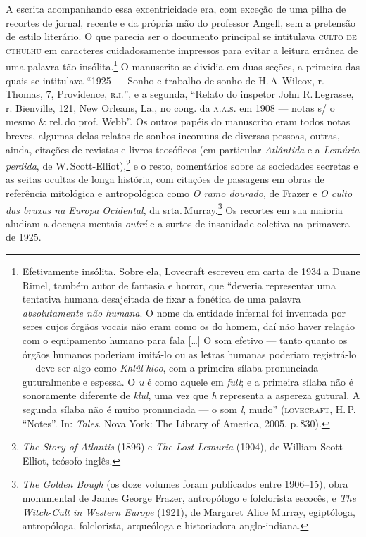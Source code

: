 A escrita acompanhando essa excentricidade era, com exceção de uma pilha
de recortes de jornal, recente e da própria mão do professor Angell, sem
a pretensão de estilo literário. O que parecia ser o documento principal
se intitulava \textsc{culto de cthulhu} em caracteres cuidadosamente
impressos para evitar a leitura errônea de uma palavra tão
insólita.\footnote{Efetivamente insólita. Sobre ela, Lovecraft escreveu
  em carta de 1934 a Duane Rimel, também autor de fantasia e horror, que
  ``deveria representar uma tentativa humana desajeitada de fixar a
  fonética de uma palavra \emph{absolutamente não humana}. O nome da
  entidade infernal foi inventada por seres cujos órgãos vocais não eram
  como os do homem, daí não haver relação com o equipamento humano para
  fala [\ldots{}] O som efetivo --- tanto quanto os órgãos humanos poderiam
  imitá-lo ou as letras humanas poderiam registrá-lo --- deve ser algo
  como \emph{Khlûl'hloo}, com a primeira sílaba pronunciada guturalmente
  e espessa. O \emph{u} é como aquele em \emph{full}; e a primeira
  sílaba não é sonoramente diferente de \emph{klul}, uma vez que
  \emph{h} representa a aspereza gutural. A segunda sílaba não é muito
  pronunciada --- o som \emph{l}, mudo'' (\textsc{lovecraft}, H.\,P. ``Notes''. In: 
 \emph{Tales}. Nova York: The Library of America, 2005, p.\,830).} O manuscrito se 
 dividia em duas
seções, a primeira das quais se intitulava ``1925 --- Sonho e trabalho
de sonho de H.\,A.\,Wilcox, r. Thomas, 7, Providence, \textsc{r.i.}'', e a
segunda, ``Relato do inspetor John R.\,Legrasse, r. Bienville, 121,
New Orleans, La., no cong. da \textsc{a.a.s.} em 1908 --- notas s/ o mesmo \& rel.\,do
prof. Webb''. Os outros papéis do manuscrito eram todos notas breves,
algumas delas relatos de sonhos incomuns de diversas pessoas, outras,
ainda, citações de revistas e livros teosóficos (em particular
\emph{Atlântida} e a \emph{Lemúria perdida}, de W.\,Scott-Elliot),\footnote{\emph{The
  Story of Atlantis} (1896) e \emph{The Lost Lemuria} (1904), de William
  Scott-Elliot, teósofo inglês.} e o resto, comentários
sobre as sociedades secretas e as seitas ocultas de longa história, com
citações de passagens em obras de referência mitológica e antropológica
como \emph{O ramo dourado}, de Frazer e \emph{O culto das bruxas na
Europa Ocidental}, da srta.\,Murray.\footnote{\emph{The Golden Bough} (os
  doze volumes foram publicados entre 1906--15), obra monumental de James
  George Frazer, antropólogo e folclorista escocês, e
  \emph{The Witch-Cult in Western Europe} (1921), de Margaret Alice
  Murray, egiptóloga, antropóloga, folclorista, arqueóloga e
  historiadora anglo-indiana.} Os recortes em sua maioria aludiam a
doenças mentais \emph{outré} e a surtos de insanidade coletiva na
primavera de 1925.

